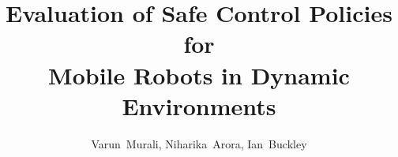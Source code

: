 \documentclass[conference]{IEEEtran}
\begin{document}
\title{Evaluation of Safe Control Policies for \\Mobile Robots in Dynamic Environments }

\author{Varun~Murali, Niharika~Arora, Ian~Buckley}





% 


\maketitle
\end{document}
